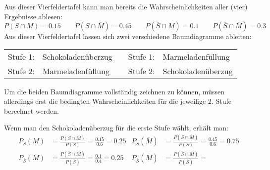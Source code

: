 \begin{exercise}
\begin{enumerate}[a)]
\begin{center}
\begin{fofotab}
              \end{fofotab}
            \end{center}
            Aus dieser Vierfeldertafel kann man bereits die
            Wahrscheinlichkeiten aller (vier) Ergebnisse
            ablesen:
            \begin{equation*}
              P(S\cap M)=\num{0.15}
              \qquad
              P(S\cap\overline{M})=\num{0.45}
              \qquad
              P(\overline{S}\cap M)=\num{0.1}
              \qquad
              P(\overline{S}\cap\overline{M})=\num{0.3}
            \end{equation*}
            Aus dieser Vierfeldertafel lassen sich
            zwei verschiedene Baumdiagramme ableiten:
            \begin{center}
              \begin{tabular}{llcll}
                Stufe 1:
                & Schokoladenüberzug
                & \qquad
                & Stufe 1:
                & Marmeladenfüllung
                \\
                Stufe 2:
                & Marmeladenfüllung
                & \qquad
                & Stufe 2: &
                Schokoladenüberzug
              \end{tabular}
            \end{center}
            Um die beiden Baumdiagramme vollständig
            zeichnen zu können, müssen allerdings
            erst die bedingten Wahrscheinlichkeiten
            für die jeweilige 2. Stufe berechnet
            werden.
            \par
            Wenn man den Schokoladenüberzug für die erste
            Stufe wählt, erhält man:
            \begin{align*}
              P_{S}(M)&=
              \frac{P(S\cap M)}{P(S)}=
              \frac{\num{0.15}}{\num{0.6}}=
              \num{0.25}
              &
              P_{S}(\overline{M})&=
              \frac{P(S\cap\overline{M})}{P(S)}=
              \frac{\num{0.45}}{\num{0.6}}=
              \num{0.75}
              \\
              P_{\overline{S}}(M)&=
              \frac{P(\overline{S}\cap M)}{P(\overline{S})}=
              \frac{\num{0.1}}{\num{0.4}}=
              \num{0.25}
              &
              P_{\overline{S}}(\overline{M})&=
              \frac{P(\overline{S}\cap\overline{M})}{P(\overline{S})}=

\end{align*}
\end{enumerate}
\end{exercise}
